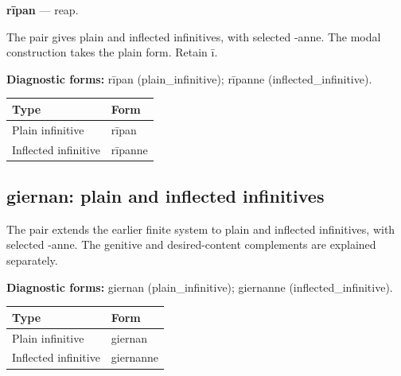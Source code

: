\par\begin{minipage}{\linewidth}\raggedright
\textbf{rīpan} — reap.

The pair gives plain and inflected infinitives, with selected -anne. The modal construction takes the plain form. Retain ī.

\textbf{Diagnostic forms:} rīpan (plain\_infinitive); rīpanne (inflected\_infinitive).

\par\begingroup
\fontsize{10.5}{13.2}\selectfont
\setlength{\LTleft}{0pt}\setlength{\LTright}{\fill}
\noindent
\begin{tabular}{@{}>{\raggedright\arraybackslash}p{71.72mm}>{\raggedright\arraybackslash}p{49.46mm}@{}}
\toprule
\textbf{Type} & \textbf{Form} \\
\midrule
Plain infinitive & rīpan \\
Inflected infinitive & rīpanne \\
\bottomrule
\end{tabular}
\par\endgroup

\end{minipage}\par
{}
\subsection*{giernan: plain and inflected infinitives}

The pair extends the earlier finite system to plain and inflected infinitives, with selected -anne. The genitive and desired-content complements are explained separately.

\textbf{Diagnostic forms:} giernan (plain\_infinitive); giernanne (inflected\_infinitive).

\par\begingroup
\fontsize{10.5}{13.2}\selectfont
\setlength{\LTleft}{0pt}\setlength{\LTright}{\fill}
\noindent
\begin{tabular}{@{}>{\raggedright\arraybackslash}p{71.72mm}>{\raggedright\arraybackslash}p{49.46mm}@{}}
\toprule
\textbf{Type} & \textbf{Form} \\
\midrule
Plain infinitive & giernan \\
Inflected infinitive & giernanne \\
\bottomrule
\end{tabular}
\par\endgroup

